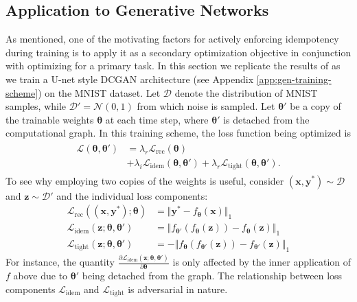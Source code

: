 \documentclass{article}
\theoremstyle{plain}
\theoremstyle{definition}
\theoremstyle{remark}
\newcommand{\vx}{\mathbf{x}}
\newcommand{\vy}{\mathbf{y}}
\newcommand{\vz}{\mathbf{z}}
\newcommand{\vtheta}{\bm{\theta}}
\newcommand{\pd}[2]{\frac{\partial{#1}}{\partial{#2}}}
\begin{document}
\subsection{Application to Generative Networks}
\label{sec:experiment-gen}
As mentioned, one of the motivating factors for actively enforcing idempotency during training is to apply it as a secondary optimization objective in conjunction with optimizing for a primary task. In this section we replicate the results of \citealt{shocher-ign} as we train a U-net style DCGAN architecture (see Appendix \ref{app:gen-training-scheme}) on the MNIST dataset. Let $\mathcal{D}$ denote the distribution of MNIST samples, while ${\mathcal{D}' = \mathcal{N}(0, 1)}$ from which noise is sampled. Let $\vtheta'$ be a copy of the trainable weights $\vtheta$ at each time step, where $\vtheta'$ is detached from the computational graph. In this training scheme, the loss function being optimized is
%
\begin{align}
    \begin{split}
        \mathcal{L}{(\vtheta, \vtheta')} & = \lambda_r \mathcal{L}_{\mathrm{rec}}{(\vtheta)}                                                                           \\
                                         & + \lambda_i \mathcal{L}_{\mathrm{idem}}{(\vtheta, \vtheta')} + \lambda_r \mathcal{L}_{\mathrm{tight}}{(\vtheta, \vtheta')}.
    \end{split}
    \label{eq:gan-loss}
\end{align}
%
To see why employing two copies of the weights is useful, consider $(\vx, \vy^*) \sim \mathcal{D}$ and $\vz \sim \mathcal{D}'$ and the individual loss components:
%
\begin{align}
    \mathcal{L}_{\mathrm{rec}}{((\vx, \vy^*); \vtheta)}    & = \Vert \vy^* - f_{\vtheta}(\vx) \Vert_1                            \\
    \mathcal{L}_{\mathrm{idem}}{(\vz; \vtheta, \vtheta')}  & = \Vert f_{\vtheta'}(f_{\vtheta}(\vz)) - f_{\vtheta}(\vz) \Vert_1   \\
    \mathcal{L}_{\mathrm{tight}}{(\vz; \vtheta, \vtheta')} & = -\Vert f_{\vtheta}(f_{\vtheta'}(\vz)) - f_{\vtheta'}(\vz) \Vert_1
\end{align}
%
For instance, the quantity $\pd{\mathcal{L}_{\mathrm{idem}}{(\vz; \vtheta, \vtheta')}}{\vtheta}$ is only affected by the inner application of $f$ above due to $\vtheta'$ being detached from the graph. The relationship between loss components $\mathcal{L}_{\mathrm{idem}}$ and $\mathcal{L}_{\mathrm{tight}}$ is adversarial in nature.
\end{document}
